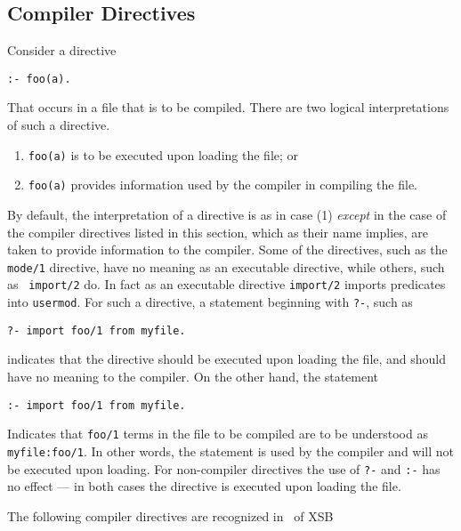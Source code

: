 \subsection{Compiler Directives}\label{compiler_directives}

Consider a directive
\begin{verbatim}
:- foo(a).
\end{verbatim}
That occurs in a file that is to be compiled.  There are two logical
interpretations of such a directive.
\begin{enumerate}
\item {\tt foo(a)} is to be executed upon loading the file; or
%
\item{\tt foo(a)} provides information used by the compiler in
compiling the file. 
\end{enumerate}

By default, the interpretation of a directive is as in case (1) {\em
except} in the case of the compiler directives listed in this section,
which as their name implies, are taken to provide information to the
compiler.  Some of the directives, such as the {\tt mode/1} directive,
have no meaning as an executable directive, while others, such as {\tt
import/2} do.  In fact as an executable directive {\tt import/2}
imports predicates into {\tt usermod}.  For such a directive, a 
statement beginning with {\tt ?-}, such as 
\begin{verbatim}
?- import foo/1 from myfile.
\end{verbatim}
indicates that the directive should be executed upon loading the file,
and should have no meaning to the compiler.  On the other hand, the
statement
\begin{verbatim}
:- import foo/1 from myfile.
\end{verbatim}
Indicates that {\tt foo/1} terms in the file to be compiled are to be
understood as {\tt myfile:foo/1}.  In other words, the statement is
used by the compiler and will not be executed upon loading.  For
non-compiler directives the use of {\tt ?-} and {\tt :-} has no effect
--- in both cases the directive is executed upon loading the file.

The following compiler directives are recognized in \version\ of XSB

